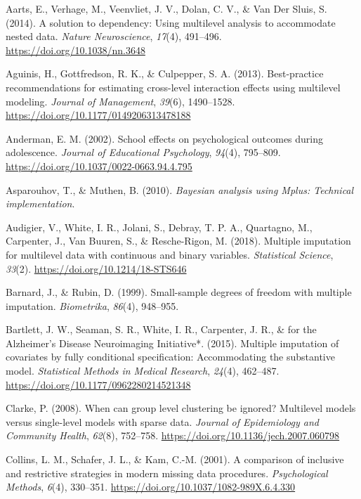 \documentclass[
  letterpaper,
  11pt,
  english,
  singlespacing,
  headsepline,
  openany]{MastersDoctoralThesis}
\newlength{\cslhangindent}
\newenvironment{CSLReferences}[2] %
 {\begin{list}{}{%
  \setlength{\itemindent}{0pt}
  \setlength{\leftmargin}{0pt}
  \setlength{\parsep}{0pt}
  \ifodd #1
   \setlength{\leftmargin}{\cslhangindent}
   \setlength{\itemindent}{-1\cslhangindent}
  \fi
  \setlength{\itemsep}{#2\baselineskip}}}
 {\end{list}}
\begin{document}
\label{refs}
\begin{CSLReferences}{1}{0}
Aarts, E., Verhage, M., Veenvliet, J. V., Dolan, C. V., \& Van Der
Sluis, S. (2014). A solution to dependency: Using multilevel analysis to
accommodate nested data. \emph{Nature Neuroscience}, \emph{17}(4),
491--496. \url{https://doi.org/10.1038/nn.3648}

Aguinis, H., Gottfredson, R. K., \& Culpepper, S. A. (2013).
Best-practice recommendations for estimating cross-level interaction
effects using multilevel modeling. \emph{Journal of Management},
\emph{39}(6), 1490--1528. \url{https://doi.org/10.1177/0149206313478188}

Anderman, E. M. (2002). School effects on psychological outcomes during
adolescence. \emph{Journal of Educational Psychology}, \emph{94}(4),
795--809. \url{https://doi.org/10.1037/0022-0663.94.4.795}

Asparouhov, T., \& Muthen, B. (2010). \emph{Bayesian analysis using
{Mplus}: {Technical} implementation}.

Audigier, V., White, I. R., Jolani, S., Debray, T. P. A., Quartagno, M.,
Carpenter, J., Van Buuren, S., \& Resche-Rigon, M. (2018). Multiple
imputation for multilevel data with continuous and binary variables.
\emph{Statistical Science}, \emph{33}(2).
\url{https://doi.org/10.1214/18-STS646}

Barnard, J., \& Rubin, D. (1999). Small-sample degrees of freedom with
multiple imputation. \emph{Biometrika}, \emph{86}(4), 948--955.

Bartlett, J. W., Seaman, S. R., White, I. R., Carpenter, J. R., \& for
the Alzheimer's Disease Neuroimaging Initiative*. (2015). Multiple
imputation of covariates by fully conditional specification:
{Accommodating} the substantive model. \emph{Statistical Methods in
Medical Research}, \emph{24}(4), 462--487.
\url{https://doi.org/10.1177/0962280214521348}

Clarke, P. (2008). When can group level clustering be ignored?
{Multilevel} models versus single-level models with sparse data.
\emph{Journal of Epidemiology and Community Health}, \emph{62}(8),
752--758. \url{https://doi.org/10.1136/jech.2007.060798}

Collins, L. M., Schafer, J. L., \& Kam, C.-M. (2001). A comparison of
inclusive and restrictive strategies in modern missing data procedures.
\emph{Psychological Methods}, \emph{6}(4), 330--351.
\url{https://doi.org/10.1037/1082-989X.6.4.330}


\end{CSLReferences}
\end{document}
